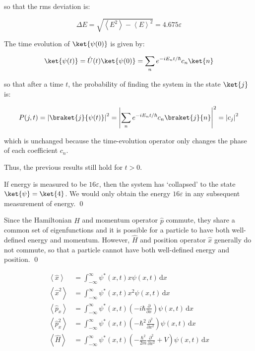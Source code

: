 \documentclass[12pt]{article}
\begin{document}
so that the rms deviation is:

\begin{equation}
    \Delta E = \sqrt{\left\langle E^{2} \right\rangle - \left\langle E \right\rangle^{2}} = 4.675 \varepsilon
\end{equation}

The time evolution of $\ket{\psi(0)}$ is given by:

\begin{equation}
    \ket{\psi(t)} = \hat{U}(t) \ket{\psi(0)} = \sum_{n} e^{-iE_{n}t/\hbar} c_{n} \ket{n}
\end{equation}

so that after a time $t$, the probability of finding the system in the state $\ket{j}$ is:

\begin{equation}
    P(j, t) = \left| \braket{j}{\psi(t)} \right|^{2} = \left| \sum_{n} e^{-iE_{n}t/\hbar} c_{n} \braket{j}{n} \right|^{2} = \left| c_{j} \right|^{2}
\end{equation}

which is unchanged because the time-evolution operator only changes the phase of each coefficient $c_{n}$.

Thus, the previous results still hold for $t > 0$.

If energy is measured to be $16\varepsilon$, then the system has `collapsed' to the state $\ket{\psi} = \ket{4}$. We would only obtain the energy $16\varepsilon$ in any subsequent measurement of energy.
\qed


Since the Hamiltonian $\hat{H}$ and momentum operator $\hat{p}$ commute, they share a common set of eigenfunctions and it is possible for a particle to have both well-defined energy and momentum. However, $\hat{H}$ and position operator $\hat{x}$ generally do not commute, so that a particle cannot have both well-defined energy and position.
\qed



\begin{equation}
    \begin{split}
        \left\langle \hat{x} \right\rangle &= \int_{-\infty}^{\infty} \psi^{*}(x,t) x \psi(x,t) \, \mathrm{d}x \\
        \left\langle \hat{x}^{2} \right\rangle &= \int_{-\infty}^{\infty} \psi^{*}(x,t) x^{2} \psi(x,t) \, \mathrm{d}x \\
        \left\langle \hat{p}_{x} \right\rangle &= \int_{-\infty}^{\infty} \psi^{*}(x,t) \left( -i\hbar \frac{\partial}{\partial x} \right) \psi(x,t) \, \mathrm{d}x \\
        \left\langle \hat{p}_{x}^{2} \right\rangle &= \int_{-\infty}^{\infty} \psi^{*}(x,t) \left( -\hbar^{2} \frac{\partial^{2}}{\partial x^{2}} \right) \psi(x,t) \, \mathrm{d}x \\
        \left\langle \hat{H} \right\rangle &= \int_{-\infty}^{\infty} \psi^{*}(x,t) \left( -\frac{\hbar^{2}}{2m} \frac{\partial^{2}}{\partial x^{2}} + V \right) \psi(x,t) \, \mathrm{d}x
    \end{split}
\end{equation}
\end{document}
